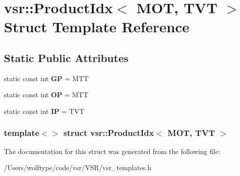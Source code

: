 \hypertarget{structvsr_1_1_product_idx_3_01_m_o_t_00_01_t_v_t_01_4}{\section{vsr\-:\-:Product\-Idx$<$ M\-O\-T, T\-V\-T $>$ Struct Template Reference}
\label{structvsr_1_1_product_idx_3_01_m_o_t_00_01_t_v_t_01_4}
}
\subsection*{Static Public Attributes}
\begin{DoxyCompactItemize}
\item 
\hypertarget{structvsr_1_1_product_idx_3_01_m_o_t_00_01_t_v_t_01_4_a46c7fe3698d94babdb91fb79e14f1d97}{static const int {\bfseries G\-P} = M\-T\-T}\label{structvsr_1_1_product_idx_3_01_m_o_t_00_01_t_v_t_01_4_a46c7fe3698d94babdb91fb79e14f1d97}

\item 
\hypertarget{structvsr_1_1_product_idx_3_01_m_o_t_00_01_t_v_t_01_4_ab22a8199c6588211dfa9f1296631381e}{static const int {\bfseries O\-P} = M\-T\-T}\label{structvsr_1_1_product_idx_3_01_m_o_t_00_01_t_v_t_01_4_ab22a8199c6588211dfa9f1296631381e}

\item 
\hypertarget{structvsr_1_1_product_idx_3_01_m_o_t_00_01_t_v_t_01_4_af9210827a97a12eb13f5928dd3559dbc}{static const int {\bfseries I\-P} = T\-V\-T}\label{structvsr_1_1_product_idx_3_01_m_o_t_00_01_t_v_t_01_4_af9210827a97a12eb13f5928dd3559dbc}

\end{DoxyCompactItemize}
\subsubsection*{template$<$$>$ struct vsr\-::\-Product\-Idx$<$ M\-O\-T, T\-V\-T $>$}



The documentation for this struct was generated from the following file\-:\begin{DoxyCompactItemize}
\item 
/\-Users/wolftype/code/vsr/\-V\-S\-R/vsr\-\_\-templates.\-h\end{DoxyCompactItemize}
